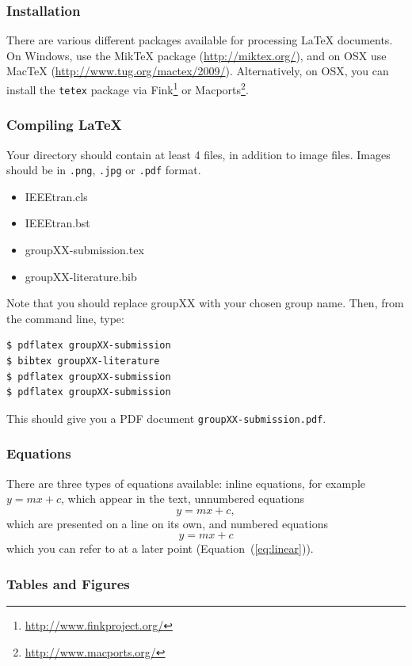 \documentclass[10pt,conference,compsocconf]{IEEEtran}
\begin{document}
\subsubsection{Installation}

There are various different packages available for processing \LaTeX{}
documents.
On Windows, use the Mik\TeX{} package (\url{http://miktex.org/}), and
on OSX use MacTeX
(\url{http://www.tug.org/mactex/2009/}). Alternatively, on OSX, you
can install the \texttt{tetex} package via
Fink\footnote{\url{http://www.finkproject.org/}} or 
Macports\footnote{\url{http://www.macports.org/}}.

\subsubsection{Compiling \LaTeX{}}
Your directory should contain at least 4 files, in addition to image
files. Images should be in \texttt{.png}, \texttt{.jpg} or
\texttt{.pdf} format.
\begin{itemize}
\item IEEEtran.cls
\item IEEEtran.bst
\item groupXX-submission.tex
\item groupXX-literature.bib
\end{itemize}
Note that you should replace groupXX with your chosen group name.
Then, from the command line, type:
\begin{verbatim}
$ pdflatex groupXX-submission
$ bibtex groupXX-literature
$ pdflatex groupXX-submission
$ pdflatex groupXX-submission
\end{verbatim}
This should give you a PDF document \texttt{groupXX-submission.pdf}.

\subsubsection{Equations}

There are three types of equations available: inline equations, for
example $y=mx + c$, which appear in the text, unnumbered equations
$$y=mx + c,$$
which are presented on a line on its own, and numbered equations
\begin{equation}
  \label{eq:linear}
  y = mx + c
\end{equation}
which you can refer to at a later point (Equation~(\ref{eq:linear})).

\subsubsection{Tables and Figures}
\end{document}
